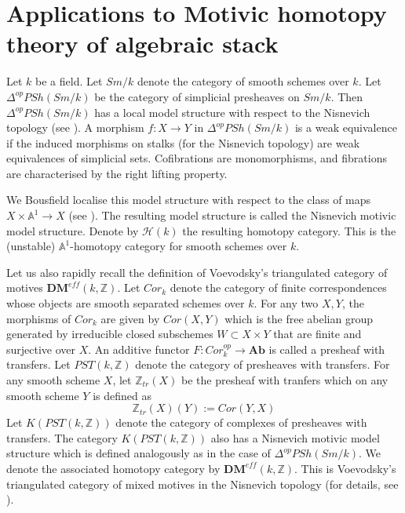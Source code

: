 \documentclass[10pt]{amsart}
\theoremstyle{plain}
\theoremstyle{definition}
\newcommand{\A}{{\mathbb A}}
\newcommand{\Z}{{\mathbb Z}}
\newcommand{\DM}[2]{\mathbf{DM}_{#2}^{\mathit{eff}}(#1)}
\begin{document}
\section{Applications to Motivic homotopy theory of algebraic stack}\label{section-applications}
Let $k$ be a field. Let $Sm/k$ denote the category of smooth schemes over $k$. Let $\Delta^{op}PSh(Sm/k)$ be the category of simplicial presheaves on $Sm/k$. Then $\Delta^{op}PSh(Sm/k)$ has a local model structure with respect to the Nisnevich topology (see \cite{Jar}). A morphism $f:X\rightarrow Y$ in $\Delta^{op}PSh(Sm/k)$ is a weak equivalence if the induced morphisms on stalks (for the Nisnevich topology) are weak equivalences of simplicial sets. Cofibrations are monomorphisms, and fibrations are characterised by the right lifting property. 

We Bousfield localise this model structure with respect to the class of maps $X\times \A^1\rightarrow X$ (see \cite[3.2]{MV}). The resulting model structure is called the Nisnevich motivic model structure. Denote by $\mathcal{H}(k)$ the resulting homotopy category. This is the (unstable) $\A^1$-homotopy category for smooth schemes over $k$.

Let us also rapidly recall the definition of Voevodsky's triangulated category of motives $\DM{k,\Z}{}$. Let $Cor_k$ denote the category of finite correspondences whose objects are smooth separated schemes over $k$. For any two $X,Y$, the morphisms of $Cor_k$ are given by $Cor(X,Y)$ which is the free abelian group generated by irreducible closed subschemes $W\subset X\times Y$ that are finite and surjective over $X$. An additive functor $F:Cor_k^{op}\rightarrow \mathbf{Ab}$ is called a presheaf with transfers. Let $PST(k,\Z)$ denote the category of presheaves with transfers. For any smooth scheme $X$, let $\Z_{tr}(X)$ be the presheaf with tranfers which on any smooth scheme $Y$ is defined as
\[\Z_{tr}(X)(Y):=Cor(Y,X)\]
Let $K(PST(k,\Z))$ denote the category of complexes of presheaves with transfers. The category $K(PST(k,\Z))$ also has a Nisnevich motivic model structure which is defined analogously as in the case of $\Delta^{op}PSh(Sm/k)$. We denote the associated homotopy category by $\DM{k,\Z}{}$. This is Voevodsky's triangulated category of mixed motives in the Nisnevich topology (for details, see \cite{MWV}).
\end{document}
